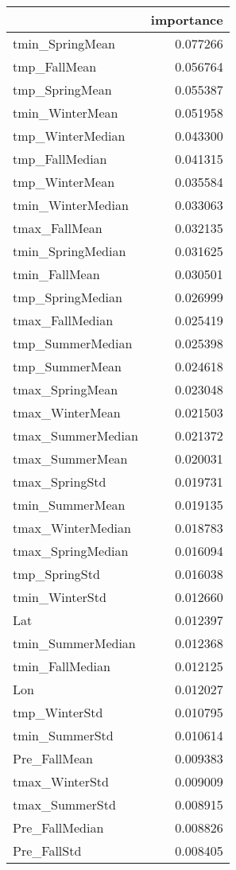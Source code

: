 \begin{tabular}{lr}
\toprule
 & importance \\
\midrule
tmin_SpringMean & 0.077266 \\
tmp_FallMean & 0.056764 \\
tmp_SpringMean & 0.055387 \\
tmin_WinterMean & 0.051958 \\
tmp_WinterMedian & 0.043300 \\
tmp_FallMedian & 0.041315 \\
tmp_WinterMean & 0.035584 \\
tmin_WinterMedian & 0.033063 \\
tmax_FallMean & 0.032135 \\
tmin_SpringMedian & 0.031625 \\
tmin_FallMean & 0.030501 \\
tmp_SpringMedian & 0.026999 \\
tmax_FallMedian & 0.025419 \\
tmp_SummerMedian & 0.025398 \\
tmp_SummerMean & 0.024618 \\
tmax_SpringMean & 0.023048 \\
tmax_WinterMean & 0.021503 \\
tmax_SummerMedian & 0.021372 \\
tmax_SummerMean & 0.020031 \\
tmax_SpringStd & 0.019731 \\
tmin_SummerMean & 0.019135 \\
tmax_WinterMedian & 0.018783 \\
tmax_SpringMedian & 0.016094 \\
tmp_SpringStd & 0.016038 \\
tmin_WinterStd & 0.012660 \\
Lat & 0.012397 \\
tmin_SummerMedian & 0.012368 \\
tmin_FallMedian & 0.012125 \\
Lon & 0.012027 \\
tmp_WinterStd & 0.010795 \\
tmin_SummerStd & 0.010614 \\
Pre_FallMean & 0.009383 \\
tmax_WinterStd & 0.009009 \\
tmax_SummerStd & 0.008915 \\
Pre_FallMedian & 0.008826 \\
Pre_FallStd & 0.008405 \\

\end{tabular}
